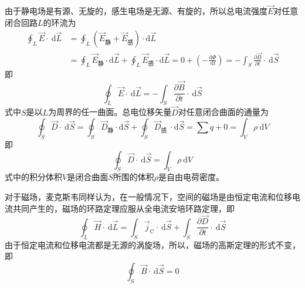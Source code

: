 \documentclass[12pt]{article}
\begin{document}
由于静电场是有源、无旋的，感生电场是无源、有旋的，所以总电流强度\(\overrightarrow{E}\)对任意闭合回路\(L\)的环流为
\begin{equation*}
\begin{aligned}
\oint_L \overrightarrow{E} \cdot \mathrm{~d} \overrightarrow{L} & =\oint_L\left(\overrightarrow{E}_{\text {静}}+\overrightarrow{E}_{\text {感}}\right) \cdot \mathrm{d} \overrightarrow{L} \\
& =\oint_L \overrightarrow{E}_{\text {静}} \cdot \mathrm{d} \overrightarrow{L}+\oint_L \overrightarrow{E}_{\text {感}} \cdot \mathrm{d} \overrightarrow{L}=0+\left(-\frac{\mathrm{d} \Phi}{\mathrm{~d} t}\right)=-\int_S \frac{\partial \overrightarrow{B}}{\partial t} \cdot \mathrm{~d} \overrightarrow{S}
\end{aligned}
\end{equation*}
即
\begin{equation}
\oint_L \overrightarrow{E} \cdot \mathrm{~d} \overrightarrow{L}=-\int_S \frac{\partial \overrightarrow{B}}{\partial t} \cdot \mathrm{~d} \overrightarrow{S}
\label{15-7}
\end{equation}
式中\(S\)是以\(L\)为周界的任一曲面。总电位移矢量\(\overrightarrow{D}\)对任意闭合曲面的通量为
\begin{equation*}
\oint_S \overrightarrow{D} \cdot \mathrm{~d} \overrightarrow{S}=\oint_S \overrightarrow{D}_{\text {静}} \cdot \mathrm{d} \overrightarrow{S}+\oint_S \overrightarrow{D}_{\text {感 }} \cdot \mathrm{d} \overrightarrow{S}=\sum q+0=\int_V \rho \mathrm{~d} V
\end{equation*}
即
\begin{equation}
\oint_S \overrightarrow{D} \cdot \mathrm{~d} \overrightarrow{S}=\int_V \rho \mathrm{~d} V
\label{15-8}
\end{equation}
式中的积分体积\(V\)是闭合曲面\(S\)所围的体积\(\rho\)是自由电荷密度。

对于磁场，麦克斯韦同样认为，在一般情况下，空间的磁场是由恒定电流和位移电流共同产生的，磁场的环路定理应服从全电流安培环路定理，即
\begin{equation}
\oint_L \overrightarrow{H} \cdot \mathrm{~d} \overrightarrow{L}=\int_S \overrightarrow{j}_{\mathrm{C}} \cdot \mathrm{~d} \overrightarrow{S}+\int_S \frac{\partial \overrightarrow{D}}{\partial t} \cdot \mathrm{~d} \overrightarrow{S}
\label{15-9}
\end{equation}
由于恒定电流和位移电流都是无源的涡旋场，所以，磁场的高斯定理的形式不变，即
\begin{equation}
\oint_S \overrightarrow{B} \cdot \mathrm{~d} \overrightarrow{S}=0
\label{15-10}
\end{equation}
\end{document}
